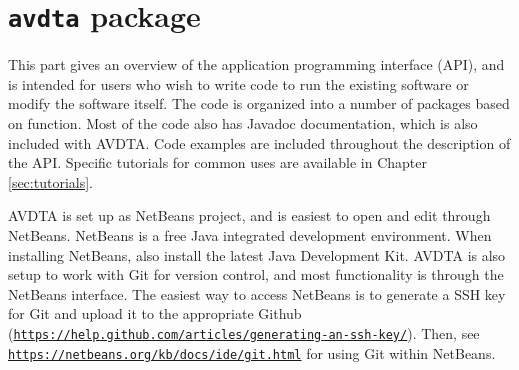 \chapter{\texttt{avdta} package}

This part gives an overview of the application programming interface (API), and is intended for users who wish to write code to run the existing software or modify the software itself. The code is organized into a number of packages based on function. Most of the code also has Javadoc documentation, which is also included with AVDTA. Code examples are included throughout the description of the API. Specific tutorials for common uses are available in Chapter \ref{sec:tutorials}.



AVDTA is set up as NetBeans project, and is easiest to open and edit through NetBeans. NetBeans is a free Java integrated development environment. When installing NetBeans, also install the latest Java Development Kit. AVDTA is also setup to work with Git for version control, and most functionality is through the NetBeans interface. The easiest way to access NetBeans is to generate a SSH key for Git and upload it to the appropriate Github  (\href{https://help.github.com/articles/generating-an-ssh-key/}{\texttt{https://help.github.com/articles/generating-an-ssh-key/}}). Then, see \href{https://netbeans.org/kb/docs/ide/git.html}{\texttt{https://netbeans.org/kb/docs/ide/git.html}} for using Git within NetBeans.


